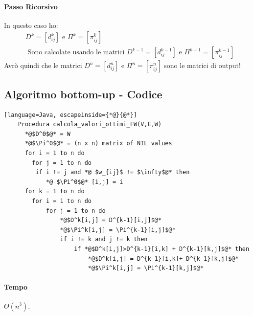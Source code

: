 \paragraph*{Passo Ricorsivo} In questo caso ho:
\begin{align*}
    &D^k=[d^k_{ij}] \text{ e } \Pi^k=[\pi^k_{ij}]\\
    &\text{ Sono calcolate usando le matrici } D^{k-1} = [d^{k-1}_{ij}] \text{ e }
    \Pi^{k-1} = [\pi^{k-1}_{ij}]
\end{align*}
Avrò quindi che le matrici $D^n = [d^n_{ij}]$ e $\Pi^n = [\pi^n_{ij}]$ sono le matrici di
output!
\subsection{Algoritmo bottom-up - Codice}
\begin{lstlisting}[language=Java, escapeinside={*@}{@*}]
    Procedura calcola_valori_ottimi_FW(V,E,W)
      *@$D^0$@* = W
      *@$\Pi^0$@* = (n x n) matrix of NIL values
      for i = 1 to n do
        for j = 1 to n do
         if i != j and *@ $w_{ij}$ != $\infty$@* then
            *@ $\Pi^0$@* [i,j] = i
      for k = 1 to n do
        for i = 1 to n do
            for j = 1 to n do
                *@$D^k[i,j] = D^{k-1}[i,j]$@*
                *@$\Pi^k[i,j] = \Pi^{k-1}[i,j]$@*
                if i != k and j != k then
                    if *@$D^k[i,j]>D^{k-1}[i,k] + D^{k-1}[k,j]$@* then
                        *@$D^k[i,j] = D^{k-1}[i,k]+ D^{k-1}[k,j]$@*
                        *@$\Pi^k[i,j] = \Pi^{k-1}[k,j]$@*
    \end{lstlisting}
\paragraph*{Tempo} $\Theta(n^3)$.